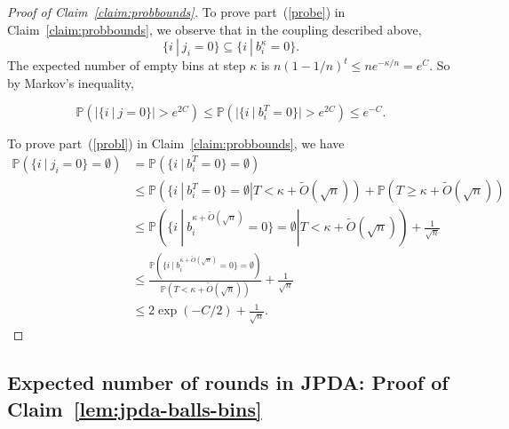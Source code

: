 \documentclass[11pt]{amsart}
\begin{document}
\begin{proof}[Proof of Claim~\ref{claim:probbounds}]
To prove part~(\ref{probe}) in Claim~\ref{claim:probbounds}, we observe that in the coupling described above, 
\[
\{i~|~j_i = 0\} \subseteq \{i~|~b_i^{\kappa} = 0\}.
\]
The expected number of empty bins at step $\kappa$ is $n(1-1/n)^t \leq ne^{-\kappa/n} = e^{C}$. So by Markov's inequality,

\[
\mathbb{P}(|\{i~|~j = 0\}|> e^{2C}) \leq \mathbb{P}(|\{i~|~b_i^T = 0\}|> e^{2C}) \leq e^{-C}.
\]

To prove part~(\ref{probl}) in Claim~\ref{claim:probbounds}, we have
\begin{align*}
\mathbb{P}(\{i~|~j_i = 0\} = \emptyset) & = \mathbb{P}(\{i~|~b_i^T = 0\} = \emptyset)\\
& \leq \mathbb{P}(\{i~|~b_i^T = 0\} = \emptyset|T<\kappa + \tilde{O}(\sqrt{n})) + \mathbb{P}(T \geq \kappa + \tilde{O}(\sqrt{n}))\\
& \leq \mathbb{P}\left(\{i~|~b_i^{\kappa + \tilde{O}(\sqrt{n})} = 0\} = \emptyset|T<\kappa + \tilde{O}(\sqrt{n})\right) +\frac{1}{\sqrt{n}}\\
& \leq \frac{\mathbb{P}\left(\{i~|~b_i^{\kappa + \tilde{O}(\sqrt{n})} = 0\} = \emptyset\right)}{\mathbb{P}(T < \kappa + \tilde{O}(\sqrt{n}))} + \frac{1}{\sqrt{n}} \\
& \leq 2\exp\left(-C/2\right) + \frac{1}{\sqrt{n}}.
\end{align*}
\end{proof}

\subsection{Expected number of rounds in JPDA: Proof of Claim~\ref{lem:jpda-balls-bins}}
\end{document}
